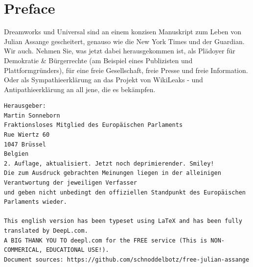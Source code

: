 



\renewcommand{\thechapter}{\Roman{chapter}}
\renewcommand{\thesection}{\Roman{section}}
\addtolength{\cftsecnumwidth}{10pt}
\addtolength{\cftchapnumwidth}{10pt}


\maketitle %

\chapter*{Preface}
\thispagestyle{empty} %
Dreamworks und Universal sind an einem konzisen Manuskript zum
Leben von Julian Assange gescheitert, genauso wie die New York Times
und der Guardian.
Wir auch.
Nehmen Sie, was jetzt dabei herausgekommen ist, als Plädoyer für Demokratie \& Bürgerrechte (am Beispiel eines Publizisten und Plattformgründers), für eine freie Gesellschaft, freie Presse und freie Information.
Oder als Sympathieerklärung an das Projekt von WikiLeaks - und Antipathieerklärung an all jene, die es bekämpfen.

\vspace*{\fill}
\begin{verbatim}
Herausgeber:
Martin Sonneborn
Fraktionsloses Mitglied des Europäischen Parlaments
Rue Wiertz 60
1047 Brüssel
Belgien
2. Auflage, aktualisiert. Jetzt noch deprimierender. Smiley!
Die zum Ausdruck gebrachten Meinungen liegen in der alleinigen Verantwortung der jeweiligen Verfasser
und geben nicht unbedingt den offiziellen Standpunkt des Europäischen Parlaments wieder.

This english version has been typeset using LaTeX and has been fully translated by DeepL.com.
A BIG THANK YOU TO deepl.com for the FREE service (This is NON-COMMERICAL, EDUCATIONAL USE!).
Document sources: https://github.com/schnoddelbotz/free-julian-assange
\end{verbatim}

\newpage
\thispagestyle{empty} %
\tableofcontents
\thispagestyle{empty} %

